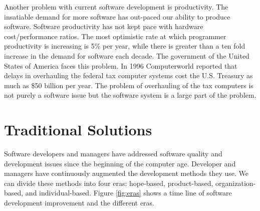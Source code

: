 Another problem with current software development is productivity. The
insatiable demand for more software has out-paced our ability to produce
software.  Software productivity has not kept pace with hardware
cost/performance ratios. The most optimistic rate at which programmer
productivity is increasing is 5\% per year, while there is greater than a ten
fold increase in the demand for software each decade.\cite{Dunn90} The
government of the United States of America faces this problem. In 1996
Computerworld reported that delays in overhauling the federal tax computer
systems cost the U.S.  Treasury as much as \$50 billion per year.\cite{Glass98}
The problem of overhauling of the tax computers is not purely a software issue
but the software system is a large part of the problem.

\section{Traditional Solutions}

Software developers and managers have addressed software quality and
development issues since the beginning of the computer age. Developer and
managers have continuously augmented the development methods they use. We can
divide these methods into four eras: hope-based, product-based,
organization-based, and individual-based.  Figure \ref{fig:eras} shows a time
line of software development improvement and the different eras.

